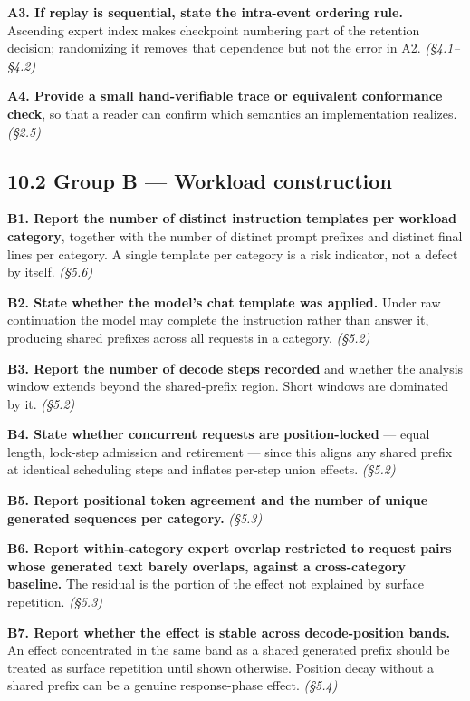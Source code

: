 \documentclass[
  10pt,
  letterpaper,
  10pt]{article}
\begin{document}
\textbf{A3. If replay is sequential, state the intra-event ordering
rule.} Ascending expert index makes checkpoint numbering part of the
retention decision; randomizing it removes that dependence but not the
error in A2. \emph{(§4.1--§4.2)}

\textbf{A4. Provide a small hand-verifiable trace or equivalent
conformance check}, so that a reader can confirm which semantics an
implementation realizes. \emph{(§2.5)}

\subsection{10.2 Group B --- Workload
construction}\label{group-b-workload-construction}

\textbf{B1. Report the number of distinct instruction templates per
workload category}, together with the number of distinct prompt prefixes
and distinct final lines per category. A single template per category is
a risk indicator, not a defect by itself. \emph{(§5.6)}

\textbf{B2. State whether the model's chat template was applied.} Under
raw continuation the model may complete the instruction rather than
answer it, producing shared prefixes across all requests in a category.
\emph{(§5.2)}

\textbf{B3. Report the number of decode steps recorded} and whether the
analysis window extends beyond the shared-prefix region. Short windows
are dominated by it. \emph{(§5.2)}

\textbf{B4. State whether concurrent requests are position-locked} ---
equal length, lock-step admission and retirement --- since this aligns
any shared prefix at identical scheduling steps and inflates per-step
union effects. \emph{(§5.2)}

\textbf{B5. Report positional token agreement and the number of unique
generated sequences per category.} \emph{(§5.3)}

\textbf{B6. Report within-category expert overlap restricted to request
pairs whose generated text barely overlaps, against a cross-category
baseline.} The residual is the portion of the effect not explained by
surface repetition. \emph{(§5.3)}

\textbf{B7. Report whether the effect is stable across decode-position
bands.} An effect concentrated in the same band as a shared generated
prefix should be treated as surface repetition until shown otherwise.
Position decay without a shared prefix can be a genuine response-phase
effect. \emph{(§5.4)}
\end{document}

